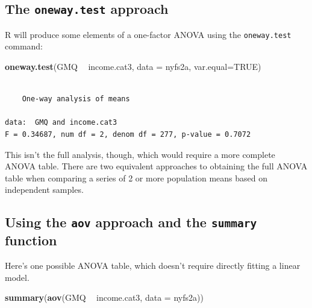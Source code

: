 \documentclass[
]{book}
\newenvironment{Shaded}{\begin{snugshade}}{\end{snugshade}}
\newcommand{\DataTypeTok}[1]{\textcolor[rgb]{0.13,0.29,0.53}{#1}}
\newcommand{\KeywordTok}[1]{\textcolor[rgb]{0.13,0.29,0.53}{\textbf{#1}}}
\newcommand{\NormalTok}[1]{#1}
\newcommand{\OperatorTok}[1]{\textcolor[rgb]{0.81,0.36,0.00}{\textbf{#1}}}
\newcommand{\OtherTok}[1]{\textcolor[rgb]{0.56,0.35,0.01}{#1}}
\newcommand{\StringTok}[1]{\textcolor[rgb]{0.31,0.60,0.02}{#1}}
\begin{document}
\hypertarget{the-oneway.test-approach}{%
\subsection{\texorpdfstring{The \texttt{oneway.test} approach}{The oneway.test approach}}\label{the-oneway.test-approach}}

R will produce some elements of a one-factor ANOVA using the \texttt{oneway.test} command:

\begin{Shaded}
\begin{Highlighting}[]
\KeywordTok{oneway.test}\NormalTok{(GMQ }\OperatorTok{~}\StringTok{ }\NormalTok{income.cat3, }\DataTypeTok{data =}\NormalTok{ nyfs2a, }\DataTypeTok{var.equal=}\OtherTok{TRUE}\NormalTok{)}
\end{Highlighting}
\end{Shaded}

\begin{verbatim}

	One-way analysis of means

data:  GMQ and income.cat3
F = 0.34687, num df = 2, denom df = 277, p-value = 0.7072
\end{verbatim}

This isn't the full analysis, though, which would require a more complete ANOVA table. There are two equivalent approaches to obtaining the full ANOVA table when comparing a series of 2 or more population means based on independent samples.

\hypertarget{using-the-aov-approach-and-the-summary-function}{%
\subsection{\texorpdfstring{Using the \texttt{aov} approach and the \texttt{summary} function}{Using the aov approach and the summary function}}\label{using-the-aov-approach-and-the-summary-function}}

Here's one possible ANOVA table, which doesn't require directly fitting a linear model.

\begin{Shaded}
\begin{Highlighting}[]
\KeywordTok{summary}\NormalTok{(}\KeywordTok{aov}\NormalTok{(GMQ }\OperatorTok{~}\StringTok{ }\NormalTok{income.cat3, }\DataTypeTok{data =}\NormalTok{ nyfs2a))}
\end{Highlighting}
\end{Shaded}
\end{document}
